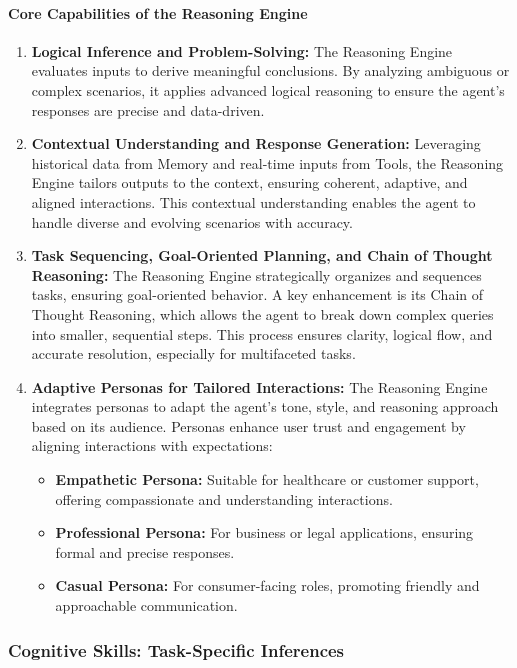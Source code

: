 \documentclass[12pt]{article}
\begin{document}
\paragraph{Core Capabilities of the Reasoning Engine}
\begin{enumerate}
    \item \textbf{Logical Inference and Problem-Solving:} The Reasoning Engine evaluates inputs to derive meaningful conclusions. By analyzing ambiguous or complex scenarios, it applies advanced logical reasoning to ensure the agent’s responses are precise and data-driven.
    \item \textbf{Contextual Understanding and Response Generation:} Leveraging historical data from Memory and real-time inputs from Tools, the Reasoning Engine tailors outputs to the context, ensuring coherent, adaptive, and aligned interactions. This contextual understanding enables the agent to handle diverse and evolving scenarios with accuracy.
    \item \textbf{Task Sequencing, Goal-Oriented Planning, and Chain of Thought Reasoning:} The Reasoning Engine strategically organizes and sequences tasks, ensuring goal-oriented behavior. A key enhancement is its Chain of Thought Reasoning, which allows the agent to break down complex queries into smaller, sequential steps. This process ensures clarity, logical flow, and accurate resolution, especially for multifaceted tasks.
    \item \textbf{Adaptive Personas for Tailored Interactions:} The Reasoning Engine integrates personas to adapt the agent’s tone, style, and reasoning approach based on its audience. Personas enhance user trust and engagement by aligning interactions with expectations:
    \begin{itemize}
        \item \textbf{Empathetic Persona:} Suitable for healthcare or customer support, offering compassionate and understanding interactions.
        \item \textbf{Professional Persona:} For business or legal applications, ensuring formal and precise responses.
        \item \textbf{Casual Persona:} For consumer-facing roles, promoting friendly and approachable communication.
    \end{itemize}
\end{enumerate}


\subsubsection{Cognitive Skills: Task-Specific Inferences}
\end{document}
